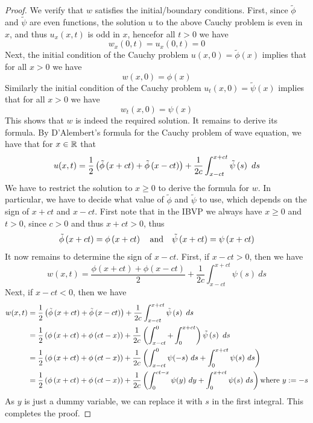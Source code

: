 \begin{proof}
    We verify that $w$ satisfies the initial/boundary conditions. First, since $\tilde{\phi}$ and $\tilde{\psi}$ are even functions, the solution $u$ to the above Cauchy problem is even in $x$, and thus $u_x(x,t)$ is odd in $x$, hencefor all $t > 0$ we have
    \[w_x(0,t) = u_x(0,t) = 0\]
    Next, the initial condition of the Cauchy problem $u(x,0) = \tilde{\phi}(x)$ implies that for all $x > 0$ we have
    \[w(x,0)=\phi(x)\]
    Similarly the initial condition of the Cauchy problem $u_t(x,0) = \tilde{\psi}(x)$ implies that for all $x > 0$ we have
    \[w_t(x,0) = \psi(x)\]
    This shows that $w$ is indeed the required solution. It remains to derive its formula. By D'Alembert's formula for the Cauchy problem of wave equation, we have that for $x\in {\mathbb R}$ that
    \[u(x,t) = \frac{1}{2}\left(\tilde\phi \left(x+ct\right) + \tilde\phi \left(x-ct\right)\right) + \frac{1}{2c} \int_{x-ct}^{x+ct}\tilde\psi \left(s\right)\ ds\]
    We have to restrict the solution to $x\geq 0$ to derive the formula for $w$. In particular, we have to decide what value of $\tilde\phi$ and $\tilde\psi$ to use, which depends on the sign of $x+ct$ and $x-ct$. First note that in the IBVP we always have $x\geq0$ and $t>0$, since $c> 0$ and thus $x+ct> 0$, thus
    \[\tilde\phi \left(x+ct\right) = \phi \left(x+ct\right) \quad \text{and} \quad \tilde\psi \left(x+ct\right) = \psi \left(x+ct\right)\]
    It now remains to determine the sign of $x-ct$. First, if $x-ct > 0$, then we have 
    \[ w(x,t) = \frac{\phi(x+ct) + \phi(x-ct)}{2} + \frac{1}{2c} \int_{x-ct}^{x+ct} \psi(s)\ ds\]
    Next, if $x-ct < 0$, then we have
    \begin{align*}
        w(x,t) &= \frac{1}{2}\br{\func{\tilde\phi}{x+ct} + \func{\tilde\phi}{x-ct}} + \frac{1}{2c} \int_{x-ct}^{x+ct}\func{\tilde\psi}{s}\ ds \\
        &= \frac{1}{2}\br{\func{\phi}{x+ct} + \func{\phi}{ct-x}} + \frac{1}{2c}\br{\int_{x-ct}^{0} + \int_0^{x+ct}}\func{\tilde\psi}{s}\ ds\\
        &= \frac{1}{2}\br{\func{\phi}{x+ct} + \func{\phi}{ct-x}} + \frac{1}{2c}\br{\int_{x-ct}^{0} \psi(-s)\ ds + \int_0^{x+ct}\psi(s)\ ds}\\
        &= \frac{1}{2}\br{\func{\phi}{x+ct} + \func{\phi}{ct-x}} + \frac{1}{2c}\br{\int_{0}^{ct-x} \psi(y)\ dy + \int_0^{x+ct}\psi(s)\ ds} \text{where } y:= -s
    \end{align*}
    As $y$ is just a dummy variable, we can replace it with $s$ in the first integral. This completes the proof.
\end{proof}

